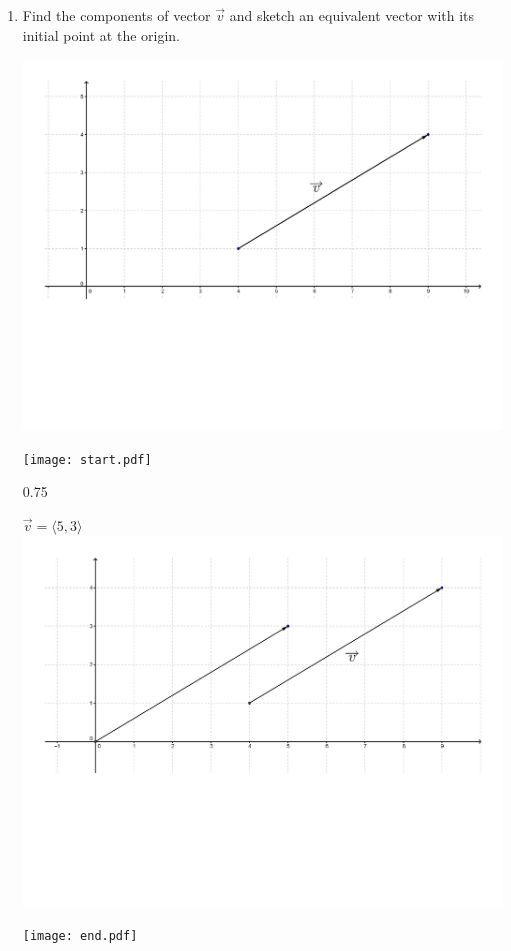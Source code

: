 \documentclass[12pt]{article}
\begin{document}
\begin{enumerate}

\item Find the components of vector $\overrightarrow{v}$ and sketch an equivalent vector with its initial point at the origin.

\begin{center}
\includegraphics[scale=0.4]{vector1.pdf}
\end{center}

\texttt{[image: start.pdf]}
{{{0.75\linewidth}{\begin{center}$\overrightarrow{v}=\langle 5,3 \rangle$\\
\includegraphics[scale=0.3]{vector1ans.pdf}\end{center}}}}
\texttt{[image: end.pdf]}



\end{enumerate}
\end{document}
